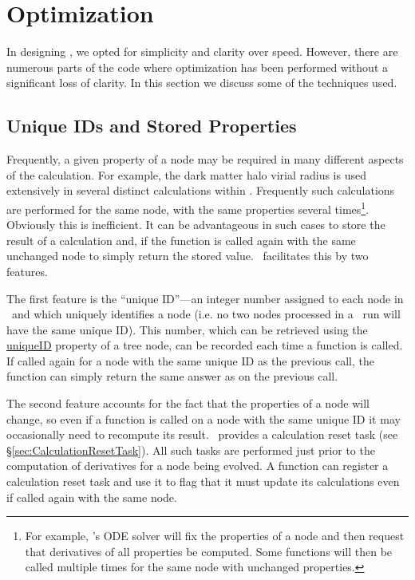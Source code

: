 \section{Optimization}\label{sec:Optimization}

In designing \glc, we opted for simplicity and clarity over speed. However, there are numerous parts of the code where optimization has been performed without a significant loss of clarity. In this section we discuss some of the techniques used.

\subsection{Unique IDs and Stored Properties}

Frequently, a given property of a node may be required in many different aspects of the calculation. For example, the dark matter halo virial radius is used extensively in several distinct calculations within \glc. Frequently such calculations are performed for the same node, with the same properties several times\footnote{For example, \glc's ODE solver will fix the properties of a node and then request that derivatives of all properties be computed. Some functions will then be called multiple times for the same node with unchanged properties.}. Obviously this is inefficient. It can be advantageous in such cases to store the result of a calculation and, if the function is called again with the same unchanged node to simply return the stored value. \glc\ facilitates this by two features.

The first feature is the ``unique ID''---an integer number assigned to each node in \glc\ and which uniquely identifies a node (i.e. no two nodes processed in a \glc\ run will have the same unique ID). This number, which can be retrieved using the \href{method:uniqueID}{{\normalfont \ttfamily uniqueID}} property of a tree node, can be recorded each time a function is called. If called again for a node with the same unique ID as the previous call, the function can simply return the same answer as on the previous call.

The second feature accounts for the fact that the properties of a node will change, so even if a function is called on a node with the same unique ID it may occasionally need to recompute its result. \glc\ provides a calculation reset task (see \S\ref{sec:CalculationResetTask}). All such tasks are performed just prior to the computation of derivatives for a node being evolved. A function can register a calculation reset task and use it to flag that it must update its calculations even if called again with the same node.


